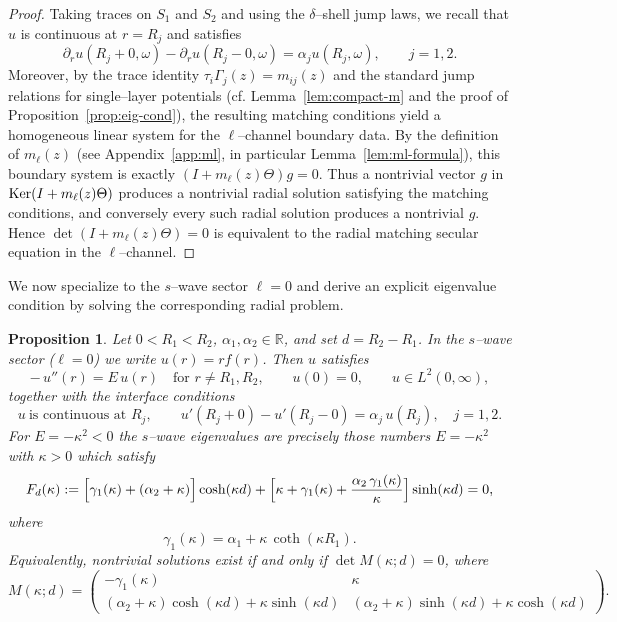 \documentclass[a4paper,11pt]{article}
\numberwithin{equation}{section}
\renewcommand{\ker}{\text{\rm Ker}}
\newtheorem{prop}[thm]{Proposition}
\theoremstyle{definition}
\theoremstyle{remark}
\begin{document}
\begin{proof}
Taking traces on $S_1$ and $S_2$ and using the $\delta$--shell jump laws,
we recall that $u$ is continuous at $r=R_j$ and satisfies
\begin{equation*}
\partial_r u(R_j+0,\omega)-\partial_r u(R_j-0,\omega)
=
\alpha_ju(R_j,\omega),
\qquad j=1,2.
\end{equation*}
Moreover, by the trace identity $\tau_i\Gamma_j(z)=m_{ij}(z)$ and the standard
jump relations for single--layer potentials (cf. Lemma~\ref{lem:compact-m} and
the proof of Proposition~\ref{prop:eig-cond}),
the resulting matching conditions yield a homogeneous linear system for the
$\ell$--channel boundary data.
By the definition of $m_\ell(z)$ (see Appendix~\ref{app:ml}, in particular
Lemma~\ref{lem:ml-formula}), this boundary system is exactly
$(I+m_\ell(z)\Theta)g=0$.
Thus a nontrivial vector $g$ in $\ker(I+m_\ell(z)\Theta)$ produces a nontrivial
radial solution satisfying the matching conditions, and conversely every such
radial solution produces a nontrivial $g$.
Hence $\det(I+m_\ell(z)\Theta)=0$ is equivalent to the radial matching secular
equation in the $\ell$--channel.
\end{proof}

We now specialize to the $s$--wave sector $\ell=0$ and derive an explicit
eigenvalue condition by solving the corresponding radial problem.
%
\begin{prop}\label{prop:s-wave-secular}
Let $0<R_1<R_2$, $\alpha_1,\alpha_2\in\mathbb R$, and set $d=R_2-R_1$.
In the $s$--wave sector ($\ell=0$) we write $u(r)=r f(r)$.
Then $u$ satisfies
\begin{equation}\label{1D}
-\,u''(r)=E\,u(r)\quad \text{for } r\ne R_1,R_2,\qquad
u(0)=0,\qquad u\in L^2(0,\infty),
\end{equation}
together with the interface conditions
\begin{equation}\label{u-jump}
u \ \text{is continuous at } R_j,\qquad
u'(R_j+0)-u'(R_j-0)=\alpha_j\,u(R_j),\quad j=1,2.
\end{equation}
For $E=-\kappa^2<0$ the $s$--wave eigenvalues are precisely those numbers
$E=-\kappa^2$ with $\kappa>0$ which satisfy
\begin{equation}\label{eq:sec}
F_d(\kappa):=\Bigl[\gamma_1(\kappa)+(\alpha_2+\kappa)\Bigr]\cosh(\kappa d)
+\Bigl[\kappa+\gamma_1(\kappa)+\frac{\alpha_2\,\gamma_1(\kappa)}{\kappa}\Bigr]\sinh(\kappa d)=0,
\end{equation}
where
\begin{equation}\label{gamma1}
\gamma_1(\kappa)=\alpha_1+\kappa\,\coth(\kappa R_1).
\end{equation}
Equivalently, nontrivial solutions exist if and only if $\det M(\kappa;d)=0$,
where
\begin{equation}\label{eq:matrix}
M(\kappa;d)=
\left(
\begin{array}{cc}
-\gamma_1(\kappa) & \kappa\\[4pt]
(\alpha_2+\kappa)\cosh(\kappa d)+\kappa\sinh(\kappa d) &
(\alpha_2+\kappa)\sinh(\kappa d)+\kappa\cosh(\kappa d)
\end{array}
\right).
\end{equation}
\end{prop}
\end{document}
